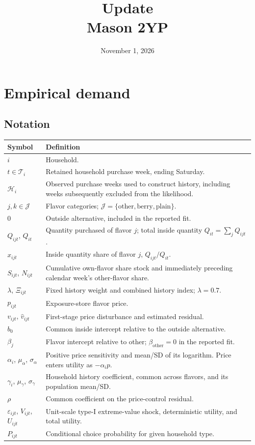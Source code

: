 \documentclass[11pt]{article}
\title{Update\\Mason 2YP}
\author{}
\date{November 1, 2026}
\begin{document}
\maketitle
\tableofcontents
\clearpage

\section{Empirical demand}
\subsection{Notation}
\small
\begin{longtable}{p{.27\linewidth}p{.67\linewidth}}
\toprule Symbol & Definition\\\midrule\endhead
$i$ & Household.\\
$t\in\mathcal T_i$ & Retained household purchase week, ending Saturday.\\
$\mathcal H_i$ & Observed purchase weeks used to construct history, including weeks subsequently excluded from the likelihood.\\
$j,k\in\mathcal J$ & Flavor categories; $\mathcal J=\{\mathrm{other},\mathrm{berry},\mathrm{plain}\}$.\\
$0$ & Outside alternative, included in the reported fit.\\
$Q_{ijt}$, $Q_{it}$ & Quantity purchased of flavor $j$; total inside quantity $Q_{it}=\sum_jQ_{ijt}$.\\
$x_{ijt}$ & Inside quantity share of flavor $j$, $Q_{ijt}/Q_{it}$.\\
$S_{ijt}$, $N_{ijt}$ & Cumulative own-flavor share stock and immediately preceding calendar week's other-flavor share.\\
$\lambda$, $\Xi_{ijt}$ & Fixed history weight and combined history index; $\lambda=0.7$.\\
$p_{ijt}$ & Exposure-store flavor price.\\
$v_{ijt}$, $\widehat v_{ijt}$ & First-stage price disturbance and estimated residual.\\
$b_0$ & Common inside intercept relative to the outside alternative.\\
$\beta_j$ & Flavor intercept relative to other; $\beta_{\mathrm{other}}=0$ in the reported fit.\\
$\alpha_i$, $\mu_\alpha$, $\sigma_\alpha$ & Positive price sensitivity and mean/SD of its logarithm. Price enters utility as $-\alpha_i p$.\\
$\gamma_i$, $\mu_\gamma$, $\sigma_\gamma$ & Household history coefficient, common across flavors, and its population mean/SD.\\
$\rho$ & Common coefficient on the price-control residual.\\
$\varepsilon_{ijt}$, $V_{ijt}$, $U_{ijt}$ & Unit-scale type-I extreme-value shock, deterministic utility, and total utility.\\
$P_{ijt}$ & Conditional choice probability for given household type.\\
\bottomrule
\end{longtable}
\normalsize
\end{document}
